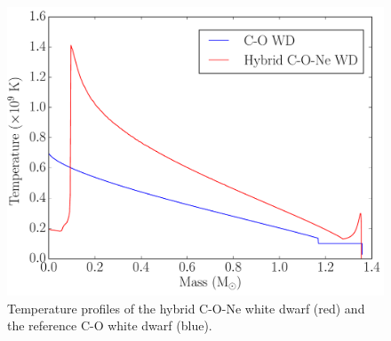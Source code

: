 \documentclass[iop,apj]{emulateapj}
\begin{document}
\begin{figure}[!ht]
	\includegraphics[width=\linewidth]{figures/compare/CO_vs_CONe_Temperature.pdf}
	\caption{\label{fig:co_vs_cone_temp} Temperature profiles of the hybrid C-O-Ne white dwarf (red) and the reference C-O white dwarf (blue).}
\end{figure}
\end{document}
